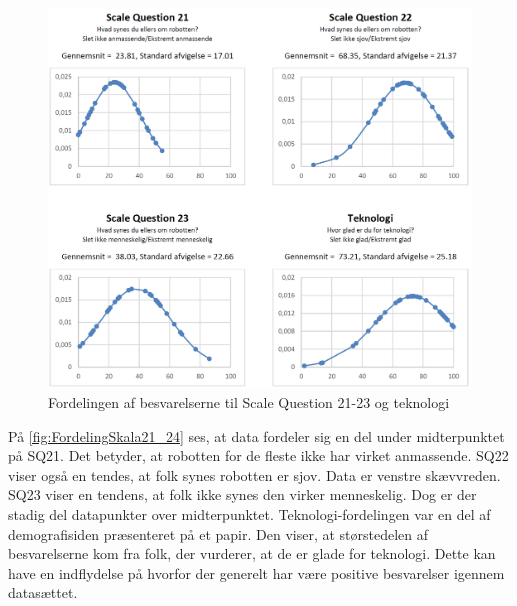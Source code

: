 \begin{figure}[H]
\centering
\includegraphics[width =\textwidth]{Figure/DatabehandlingSkalaer/FordelingSkala21_24} 
\caption{Fordelingen af besvarelserne til Scale Question 21-23 og teknologi}
\label{fig:FordelingSkala21_24}
\end{figure}
\noindent
%
På \autoref{fig:FordelingSkala21_24} ses, at data fordeler sig en del under midterpunktet på SQ21. Det betyder, at robotten for de fleste ikke har virket anmassende. SQ22 viser også en tendes, at folk synes robotten er sjov. Data er venstre skævvreden. SQ23 viser en tendens, at folk ikke synes den virker menneskelig. Dog er der stadig del datapunkter over midterpunktet. Teknologi-fordelingen var en del af demografisiden præsenteret på et papir. Den viser, at størstedelen af besvarelserne kom fra folk, der vurderer, at de er glade for teknologi. Dette kan have en indflydelse på hvorfor der generelt har være positive besvarelser igennem datasættet. 